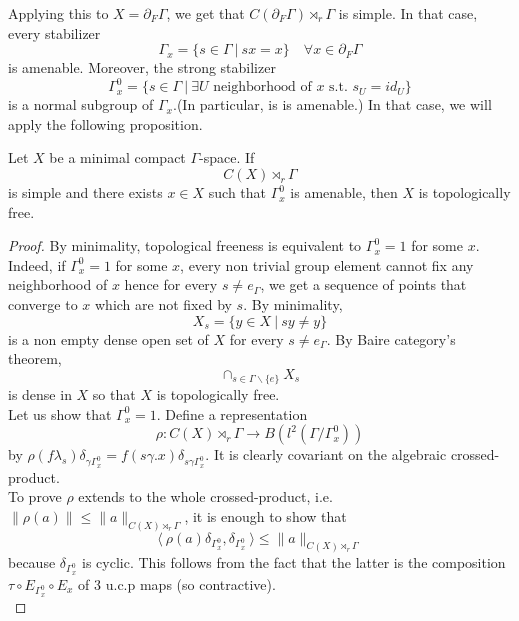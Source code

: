 Applying this to $X=\partial_F \Gamma$, we get that $C(\partial_F \Gamma)\rtimes_r \Gamma$ is simple. In that case, every stabilizer
\[\Gamma_x = \{ s\in \Gamma \ | \ sx=x \} \quad \forall x\in \partial_F\Gamma\]
is amenable. Moreover, the strong stabilizer
\[\Gamma^0_x = \{ s\in \Gamma \ | \ \exists U\text{ neighborhood of }x \text{ s.t. } s_U=id_U  \} \]
is a normal subgroup of $\Gamma_x$.(In particular, is is amenable.) In that case, we will apply the following proposition.

\begin{prop}
Let $X$ be a minimal compact $\Gamma$-space. If 
\[C(X)\rtimes_r \Gamma\]
is simple and there exists $x\in X$ such that $\Gamma^0_x$ is amenable, then $X$ is topologically free.
\end{prop}

\begin{proof}
By minimality, topological freeness is equivalent to $\Gamma^0_x=1$ for some $x$.\\ 

Indeed, if $\Gamma^0_x = 1$ for some $x$, every non trivial group element cannot fix any neighborhood of $x$ hence for every $s\neq e_\Gamma$, we get a sequence of points that converge to $x$ which are not fixed by $s$. By minimality,
\[X_s = \{ y \in X \ | \ sy \neq y \}\]
is a non empty dense open set of $X$ for every $s\neq e_\Gamma$. By Baire category's theorem, 
\[\cap_{s\in \Gamma\backslash \{e\}} X_s\]
is dense in $X$ so that $X$ is topologically free.\\

Let us show that $\Gamma^0_x=1$. Define a representation
\[\rho : C(X)\rtimes_r \Gamma \rightarrow B(l^2(\Gamma / \Gamma^0_x))\]
by $\rho(f\lambda_s) \delta_{\gamma \Gamma^0_x} = f(s\gamma.x) \delta_{s\gamma \Gamma^0_x}$. It is clearly covariant on the algebraic crossed-product.\\ 

To prove $\rho$ extends to the whole crossed-product, i.e. $\|\rho(a) \| \leq \| a\|_{C(X)\rtimes_r \Gamma}$, it is enough to show that 
\[\langle \ \rho(a)\delta_{\Gamma_x^0} , \delta_{\Gamma_x^0} \ \rangle \leq \| a\|_{C(X)\rtimes_r \Gamma}\]
because $\delta_{\Gamma^0_x}$ is cyclic. This follows from the fact that the latter is the composition $\tau \circ E_{\Gamma_x^0} \circ E_x$ of 3 u.c.p maps (so contractive).\\
 

\end{proof}
